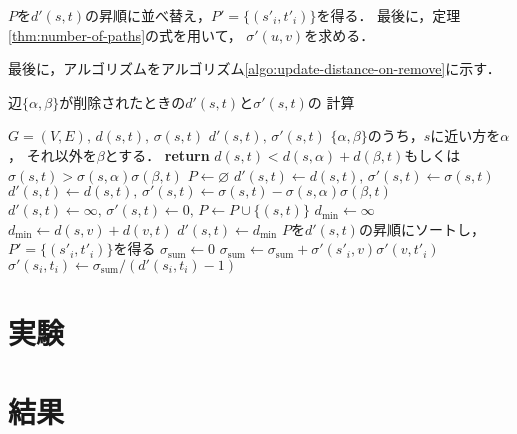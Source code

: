 $P$を$d'(s,t)$の昇順に並べ替え，$P'=\{(s'_i,t'_i)\}$を得る．
最後に，定理\ref{thm:number-of-paths}の式を用いて，
$\sigma'(u,v)$を求める．

最後に，アルゴリズムをアルゴリズム\ref{algo:update-distance-on-remove}に示す．
\begin{algorithm}
  \caption{辺$\{\alpha,\beta\}$が削除されたときの$d'(s,t)$と$\sigma'(s,t)$の
  計算}\label{algo:update-distance-on-remove}
  \begin{algorithmic}[1]
    \Require $G=(V,E),\,d(s,t),\,\sigma(s,t)$
    \Ensure $d'(s,t),\,\sigma'(s,t)$
    \State $\{\alpha,\beta\}$のうち，$s$に近い方を$\alpha$，
    それ以外を$\beta$とする．
    \State \textbf{return} $d(s,t)<d(s,\alpha)+d(\beta,t)$もしくは
    $\sigma(s,t)>\sigma(s,\alpha)\sigma(\beta,t)$
    \EndProcedure
    \State $P\gets\varnothing$
    \State $d'(s,t)\gets d(s,t),\,\sigma'(s,t)\gets\sigma(s,t)$
    \State $d'(s,t)\gets d(s,t),\,\sigma'(s,t)\gets\sigma(s,t)
    -\sigma(s,\alpha)\sigma(\beta,t)$
    \Else{}
    \State $d'(s,t)\gets\infty,\,\sigma'(s,t)\gets0,\,P\gets P\cup\{(s,t)\}$
    \EndIf
    \EndFor
    \State $d_{\min}\gets\infty$
    \State $d_{\min}\gets d(s,v)+d(v,t)$
    \EndIf
    \EndIf
    \EndFor
    \State $d'(s,t)\gets d_{\min}$
    \EndFor
    \State $P$を$d'(s,t)$の昇順にソートし，$P'=\{(s'_i,t'_i)\}$を得る
    \State $\sigma_{\mathrm{sum}}\gets0$
    \State $\sigma_{\mathrm{sum}}\gets
    \sigma_{\mathrm{sum}}+\sigma'(s'_i,v)\sigma'(v,t'_i)$
    \EndIf
    \EndFor
    \State $\sigma'(s_i,t_i)\gets\sigma_{\mathrm{sum}}/(d'(s_i,t_i)-1)$
    \EndFor
    \EndProcedure
  \end{algorithmic}
\end{algorithm}

\section{実験}

\section{結果}

